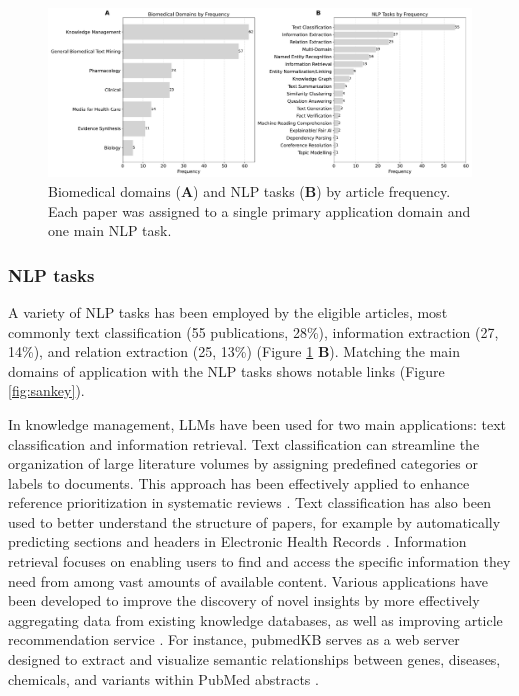 \documentclass[fleqn,10pt]{olplainarticle}
\begin{document}
\begin{figure}[!ht]
\begin{center}
\includegraphics[scale=0.30]{visuals/new_pdf/domains_and_nlp_tasks_frequency_2024.pdf} %
\caption{Biomedical domains (\textbf{A}) and NLP tasks (\textbf{B}) by article frequency. Each paper was assigned to a single primary application domain and one main NLP task.}
\label{fig:domains_and_nlp_tasks_frequency}
\end{center}
\end{figure}


\subsubsection*{NLP tasks}

A variety of NLP tasks has been employed by the eligible articles, most commonly text classification (55 publications, 28\%), information extraction (27, 14\%), and relation extraction (25, 13\%) (Figure \ref{fig:domains_and_nlp_tasks_frequency} \textbf{B}).
Matching the main domains of application with the NLP tasks shows notable links (Figure \ref{fig:sankey}). 

In knowledge management, LLMs have been used for two main applications: text classification and information retrieval. Text classification can streamline the organization of large literature volumes by assigning predefined categories or labels to documents. This approach has been effectively applied to enhance reference prioritization in systematic reviews \citep{mantas2021classification, aum2021srbert, ambalavanan2020using, habets2022development, jimeno2023classifying}. Text classification has also been used to better understand the structure of papers, for example by automatically predicting sections and headers in Electronic Health Records \citep{rosenthal2019leveraging}. Information retrieval focuses on enabling users to find and access the specific information they need from among vast amounts of available content. Various applications have been developed to improve the discovery of novel insights by more effectively aggregating data from existing knowledge databases, as well as improving article recommendation service \citep{martenot2022lisa, kart2022emati}. For instance, pubmedKB serves as a web server designed to extract and visualize semantic relationships between genes, diseases, chemicals, and variants within PubMed abstracts \citep{li2022pubmedkb}.
\end{document}
